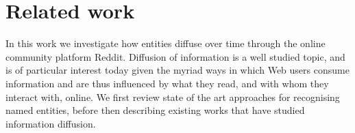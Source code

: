 \documentclass[acmsmall]{acmart}
\begin{document}
%
%
%
%



\section{Related work}
\label{sec:rw}
In this work we investigate how entities diffuse over time through the online community platform Reddit.
Diffusion of information is a well studied topic, and is of particular interest today given the myriad ways in which Web users consume information and are thus influenced by what they read, and with whom they interact with, online.
We first review state of the art approaches for recognising named entities, before then describing existing works that have studied information diffusion.
\end{document}
